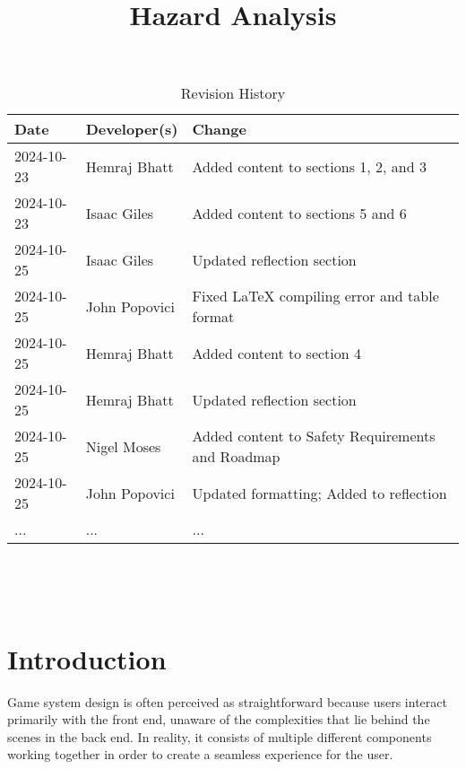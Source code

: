 \documentclass{article}
\title{Hazard Analysis\\\progname}
\author{\authname}
\date{}
\begin{document}
\maketitle
\thispagestyle{empty}



\begin{table}[hp]
\caption{Revision History} \label{TblRevisionHistory}
\begin{tabularx}{\textwidth}{llX}
\toprule
\textbf{Date} & \textbf{Developer(s)} & \textbf{Change}\\
\midrule
2024-10-23 & Hemraj Bhatt & Added content to sections 1, 2, and 3\\
2024-10-23 & Isaac Giles & Added content to sections 5 and 6 \\
2024-10-25 & Isaac Giles & Updated reflection section \\
2024-10-25 & John Popovici & Fixed LaTeX compiling error and table format \\
2024-10-25 & Hemraj Bhatt & Added content to section 4\\
2024-10-25 & Hemraj Bhatt & Updated reflection section\\
2024-10-25 & Nigel Moses & Added content to Safety Requirements and Roadmap\\
2024-10-25 & John Popovici & Updated formatting; Added to reflection \\
... & ... & ...\\
\bottomrule
\end{tabularx}
\end{table}

~\newpage

\tableofcontents

~\newpage



\section{Introduction}

Game system design is often perceived as straightforward because users interact primarily with the front end, unaware of the complexities that lie behind the scenes in the back end. In reality, it consists of multiple different components working together in order to create a seamless experience for the user.\\
\end{document}
